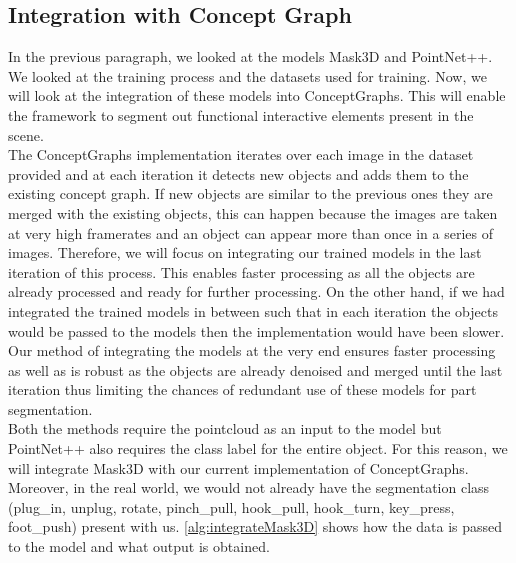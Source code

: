 \subsection{Integration with Concept Graph}
In the previous paragraph,  we looked at the models Mask3D and PointNet++. We looked at the training process and the datasets used for training. Now, we will 
look at the integration of these models into ConceptGraphs. This will enable the framework to segment out functional interactive elements present in
the scene. \\
The ConceptGraphs implementation iterates over each image in the dataset provided and at each iteration it detects new objects and adds them to 
the existing concept graph. If new objects are similar to the previous ones they are merged with the existing objects, this can happen because
the images are taken at very high framerates and an object can appear more than once in a series of images. 
Therefore, we will focus on integrating our trained models in the last iteration of this process. This enables faster processing as
all the objects are already processed and ready for further processing. On the other hand, if we had integrated the trained models in between
such that in each iteration the objects would be passed to the models then the implementation would have been slower. Our method of integrating the 
models at the very end ensures faster processing as well as is robust as the objects are already denoised and merged until the last iteration thus
limiting the chances of redundant use of these models for part segmentation. \\
Both the methods require the pointcloud as an input to the model but PointNet++ also requires the class label for the entire object. For this reason,
we will integrate Mask3D with our current implementation of ConceptGraphs. Moreover, in the real world, we would not already have the segmentation class (plug\_in,
unplug, rotate, pinch\_pull, hook\_pull, hook\_turn, key\_press, foot\_push) present with us. \cref{alg:integrateMask3D} shows how the data is passed to
the model and what output is obtained.
